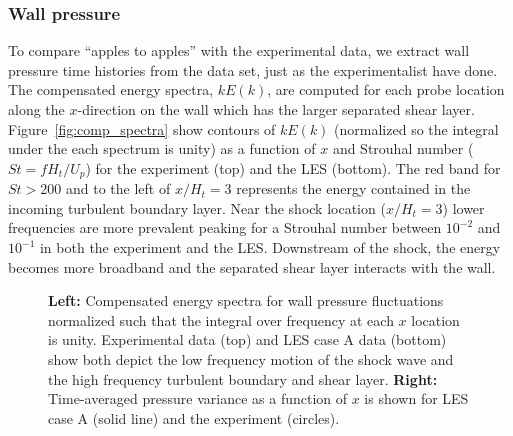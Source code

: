 \documentclass[]{aiaa-tc}%
\begin{document}
\subsubsection{Wall pressure}

To compare ``apples to apples'' with the experimental data, we extract wall pressure time histories from the data set, just as the experimentalist have done.  The compensated energy spectra, $kE(k)$, are computed for each probe location along the $x$-direction on the wall which has the larger separated shear layer.  Figure~\ref{fig:comp_spectra} show contours of $kE(k)$ (normalized so the integral under the each spectrum is unity) as a function of $x$ and Strouhal number ($St=fH_t/U_p$) for the experiment (top) and the LES (bottom).  The red band for $St>200$ and to the left of $x/H_t=3$ represents the energy contained in the incoming turbulent boundary layer.  Near the shock location ($x/H_t=3$) lower frequencies are more prevalent peaking for a Strouhal number between $10^{-2}$ and $10^{-1}$ in both the experiment and the LES.  Downstream of the shock, the energy becomes more broadband and the separated shear layer interacts with the wall.  

\begin{figure}[!h]
	\caption{ {\bf Left:} Compensated energy spectra for wall pressure fluctuations normalized such that the integral over frequency at each $x$ location is unity.  Experimental data (top) and LES case A data (bottom) show both depict the low frequency motion of the shock wave and the high frequency turbulent boundary and shear layer. {\bf Right:} Time-averaged pressure variance as a function of $x$ is shown for LES case A (solid line) and the experiment (circles).
	}
\end{figure}
\end{document}
